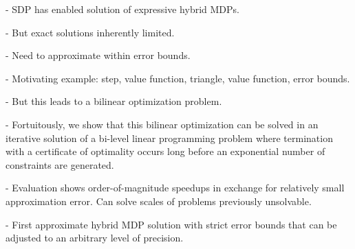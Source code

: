 
- SDP has enabled solution of expressive hybrid MDPs.

- But exact solutions inherently limited.

- Need to approximate within error bounds.

- Motivating example: step, value function, triangle, value function, 
  error bounds.

- But this leads to a bilinear optimization problem.

- Fortuitously, we show that this bilinear optimization can be solved
  in an iterative solution of a bi-level linear programming problem
  where termination with a certificate of optimality occurs long
  before an exponential number of constraints are generated.

- Evaluation shows order-of-magnitude speedups in exchange for
  relatively small approximation error.  Can solve scales of problems
  previously unsolvable.

- First approximate hybrid MDP solution with strict error bounds that
  can be adjusted to an arbitrary level of precision.
